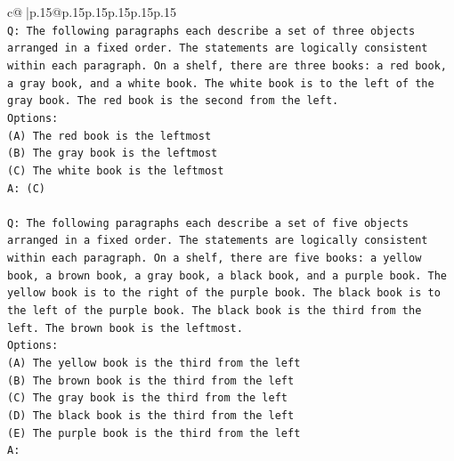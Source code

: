 \documentclass{article}
\begin{document}
{\begin{supertabular}{c@{$\;$}|p{.15\linewidth}@{}p{.15\linewidth}p{.15\linewidth}p{.15\linewidth}p{.15\linewidth}p{.15\linewidth}}
{{{\\ 
\texttt{Q: The following paragraphs each describe a set of three objects arranged in a fixed order. The statements are logically consistent within each paragraph. On a shelf, there are three books: a red book, a gray book, and a white book. The white book is to the left of the gray book. The red book is the second from the left.} \\
\texttt{Options:} \\
\texttt{(A) The red book is the leftmost} \\
\texttt{(B) The gray book is the leftmost} \\
\texttt{(C) The white book is the leftmost} \\
\texttt{A: (C)} \\
\\ 
\texttt{Q: The following paragraphs each describe a set of five objects arranged in a fixed order. The statements are logically consistent within each paragraph. On a shelf, there are five books: a yellow book, a brown book, a gray book, a black book, and a purple book. The yellow book is to the right of the purple book. The black book is to the left of the purple book. The black book is the third from the left. The brown book is the leftmost.} \\
\texttt{Options:} \\
\texttt{(A) The yellow book is the third from the left} \\
\texttt{(B) The brown book is the third from the left} \\
\texttt{(C) The gray book is the third from the left} \\
\texttt{(D) The black book is the third from the left} \\
\texttt{(E) The purple book is the third from the left} \\
\texttt{A:} \\
            }
        }
    }
     \\ \\


\end{supertabular}}
\end{document}
